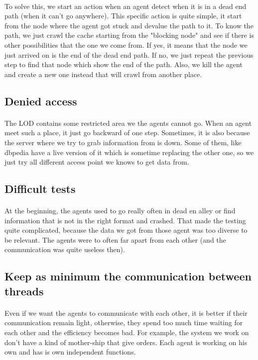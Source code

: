 \documentclass{article}
\begin{document}
		\paragraph{}
			To solve this, we start an action when an agent detect when it is in a dead end path (when it can't go anywhere).
			This specific action is quite simple, it start from the node where the agent got stuck and devalue the path to it.
			To know the path, we just crawl the cache starting from the "blocking node"
			and see if there is other possibilities that the one we come from.
			If yes, it means that the node we just arrived on is the end of the dead end path.
			If no, we just repeat the previous step to find that node which show the end of the path.
			Also, we kill the agent and create a new one instead that will crawl from another place.
	\subsection{Denied access}
		\paragraph{}
			The LOD contains some restricted area we the agents cannot go.
			When an agent meet such a place, it just go backward of one step.
			Sometimes, it is also because the server where we try to grab information from is down.
			Some of them, like dbpedia have a live version of it which is sometime replacing the other one,
			so we just try all different access point we knows to get data from.
	\subsection{Difficult tests}
		\paragraph{}
			At the beginning, the agents used to go really often in dead en alley
			or find information that is not in the right format and crashed.
			That made the testing quite complicated, because the data we got from those agent was too diverse to be relevant.
			The agents were to often far apart from each other (and the communication was quite useless then).
	\subsection{Keep as minimum the communication between threads}
		\paragraph{}
			Even if we want the agents to communicate with each other, it is better if their communication remain light,
			otherwise, they spend too much time waiting for each other and the efficiency becomes bad.
			For example, the system we work on don't have a kind of mother-ship that give orders.
			Each agent is working on his own and has is own independent functions.
\end{document}
